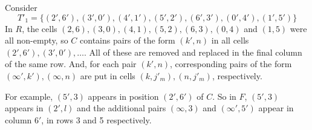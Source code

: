 \begin{example}
Consider
\begin{equation}
T'_1 = \{(2',6'),(3',0'),(4',1'),(5',2'),(6',3'),(0',4'),(1',5')\}
\end{equation}
In $R$, the cells $(2, 6), (3, 0), (4, 1), (5, 2), (6, 3), (0, 4)$ and $(1, 5)$ were all non-empty, so $C$ contains pairs of the form $(k', n)$ in all cells $(2', 6'), (3', 0'), \ldots$.
All of these are removed and replaced in the final column of the same row.
And, for each pair $(k', n)$, corresponding pairs of the form $(\infty ', k'), (\infty,n)$ are put in cells $(k, j'_m), (n, j'_m)$, respectively.

For example, $(5',3)$ appears in position $(2', 6')$ of $C$.
So in $F$, $(5', 3)$ appears in $(2', l)$ and the additional pairs $(\infty, 3)$ and $(\infty ', 5')$ appear in column $6'$, in rows 3 and 5 respectively.


\end{example}
